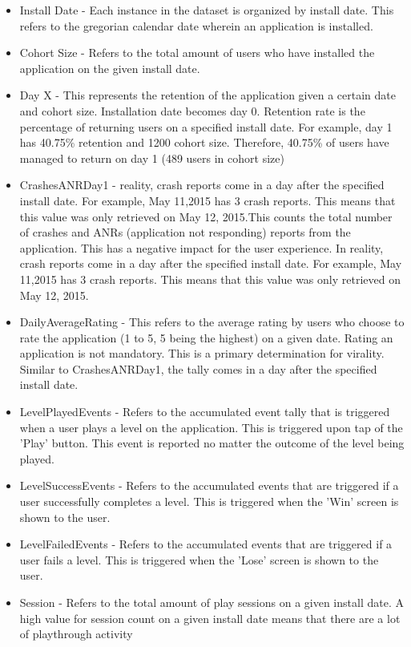 \begin{itemize}
\item Install Date - Each instance in the dataset is organized by install date. This refers to the gregorian calendar date wherein an application is installed.
\item Cohort Size - Refers to the total amount of users who have installed the application on the given install date.
\item Day X - This represents the retention of the application given a certain date and cohort size. Installation date becomes day 0. Retention rate is the percentage of returning users on a specified install date. For example, day 1 has 40.75\% retention and 1200 cohort size. Therefore, 40.75\% of users have managed to return on day 1 (489 users in cohort size)
\item CrashesANRDay1 - reality, crash reports come in a day after the specified install date. For example, May 11,2015 has 3 crash reports. This means that this value was only retrieved on May 12, 2015.This counts the total number of crashes and ANRs (application not responding) reports from the application. This has a negative impact for the user experience. In reality, crash reports come in a day after the specified install date. For example, May 11,2015 has 3 crash reports. This means that this value was only retrieved on May 12, 2015.
\item DailyAverageRating - This refers to the average rating by users who choose to rate the application (1 to 5, 5 being the highest) on a given date. Rating an application is not mandatory. This is a primary determination for virality. Similar to CrashesANRDay1, the tally comes in a day after the specified install date.
\item LevelPlayedEvents - Refers to the accumulated event tally that is triggered when a user plays a level on the application. This is triggered upon tap of the 'Play' button. This event is reported no matter the outcome of the level being played.
\item LevelSuccessEvents - Refers to the accumulated events that are triggered if a user successfully completes a level. This is triggered when the 'Win' screen is shown to the user.
\item LevelFailedEvents - Refers to the accumulated events that are triggered if a user fails a level. This is triggered when the 'Lose' screen is shown to the user.
\item Session - Refers to the total amount of play sessions on a given install date. A high value for session count on a given install date means that there are a lot of playthrough activity 

\end{itemize}
